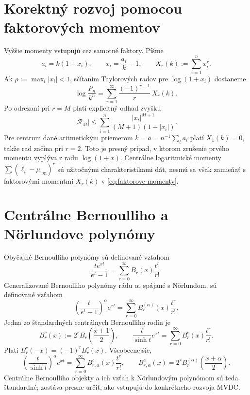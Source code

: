 \documentclass[11pt,a4paper]{article}
\begin{document}
\section{Korektný rozvoj pomocou faktorových momentov}

Vyššie momenty vstupujú cez samotné faktory. Píšme
\[
  a_i=k(1+x_i),\qquad x_i=\frac{a_i}{k}-1,
  \qquad X_r(k):=\sum_{i=1}^{n}x_i^r .
\]
Ak \(\rho:=\max_i|x_i|<1\), sčítaním Taylorových radov pre
\(\log(1+x_i)\) dostaneme
\begin{equation}\label{eq:faktorove-momenty}
  \boxed{\;
  \log\frac{P_n}{k^n}
  =\sum_{r=1}^{\infty}\frac{(-1)^{r-1}}{r}\,X_r(k).\;}
\end{equation}
Po odrezaní pri \(r=M\) platí explicitný odhad zvyšku
\[
  |\mathcal R_M|
  \le
  \sum_{i=1}^{n}
  \frac{|x_i|^{M+1}}{(M+1)(1-|x_i|)}.
\]
Pre centrum dané aritmetickým priemerom
\(k=\bar a=n^{-1}\sum_i a_i\) platí \(X_1(k)=0\), takže rad začína pri
\(r=2\). Toto je presný prípad, v ktorom zrušenie prvého momentu
vyplýva z radu \(\log(1+x)\). Centrálne logaritmické momenty
\(\sum(\ell_i-\mu_{\log})^r\) sú užitočnými charakteristikami dát,
nesmú sa však zamieňať s faktorovými momentmi \(X_r(k)\) v
\eqref{eq:faktorove-momenty}.

\section{Centrálne Bernoulliho a Nörlundove polynómy}

Obyčajné Bernoulliho polynómy sú definované vzťahom
\[
  \frac{t e^{xt}}{e^t-1}
  =\sum_{r=0}^{\infty}B_r(x)\frac{t^r}{r!}.
\]
Generalizované Bernoulliho polynómy rádu \(\alpha\), spájané s
Nörlundom, sú definované vzťahom
\begin{equation}\label{eq:norlund-sk}
  \left(\frac{t}{e^t-1}\right)^\alpha e^{xt}
  =\sum_{r=0}^{\infty}B_r^{(\alpha)}(x)\frac{t^r}{r!}.
\end{equation}
Jedna zo štandardných centrálnych Bernoulliho rodín je
\begin{equation}\label{eq:centralne-bernoulli-sk}
  B_r^c(x):=2^rB_r\!\left(\frac{x+1}{2}\right),
  \qquad
  \frac{t}{\sinh t}e^{xt}
  =\sum_{r=0}^{\infty}B_r^c(x)\frac{t^r}{r!}.
\end{equation}
Platí \(B_r^c(-x)=(-1)^rB_r^c(x)\). Všeobecnejšie,
\[
  \left(\frac{t}{\sinh t}\right)^\alpha e^{xt}
  =\sum_{r=0}^{\infty}B_{r,\alpha}^c(x)\frac{t^r}{r!},
  \qquad
  B_{r,\alpha}^c(x)
  =2^rB_r^{(\alpha)}\!\left(\frac{x+\alpha}{2}\right).
\]
Centrálne Bernoulliho objekty a ich vzťah k Nörlundovým polynómom sú
teda štandardné; zostáva presne určiť, ako vstupujú do konkrétneho
rozvoja MVDC.
\end{document}
